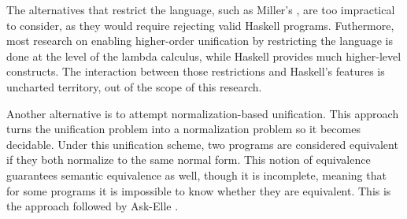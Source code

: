 The alternatives that restrict the language, such as Miller's \cite{1991miller}, are too impractical to consider, as they would require rejecting valid Haskell programs. Futhermore, most research on enabling higher-order unification by restricting the language is done at the level of the lambda calculus, while Haskell provides much higher-level constructs. The interaction between those restrictions and Haskell's features is uncharted territory, out of the scope of this research.

Another alternative is to attempt normalization-based unification. This approach turns the unification problem into a normalization problem so it becomes decidable. Under this unification scheme, two programs are considered equivalent if they both normalize to the same normal form. This notion of equivalence guarantees semantic equivalence as well, though it is incomplete, meaning that for some programs it is impossible to know whether they are equivalent. This is the approach followed by Ask-Elle \cite{2010askelle}.






